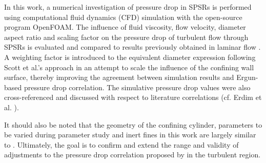 In this work, a numerical investigation of pressure drop in SPSRs is performed using computational fluid dynamics (CFD) simulation with the open-source program OpenFOAM\textsuperscript{\textregistered}. The influence of fluid viscosity, flow velocity, diameter aspect ratio and scaling factor on the pressure drop of turbulent flow through SPSRs is evaluated and compared to results previously obtained in laminar flow \cite{Fernengel2020}.
A weighting factor is introduced to the equivalent diameter expression following Scott et al.'s approach \cite{Scott1974} in an attempt to scale the influence of the confining wall surface, thereby improving the agreement between simulation results and Ergun-based pressure drop correlation. The simulative pressure drop values were also cross-referenced and discussed with respect to literature correlations (cf. Erdim et al. \cite{Erdim2015}).

It should also be noted that the geometry of the confining cylinder, parameters to be varied during parameter study and inert fines in this work are largely similar to \cite{Fernengel2020}.
Ultimately, the goal is to confirm and extend the range and validity of adjustments to the pressure drop correlation proposed by \cite{Fernengel2020} in the turbulent region.

